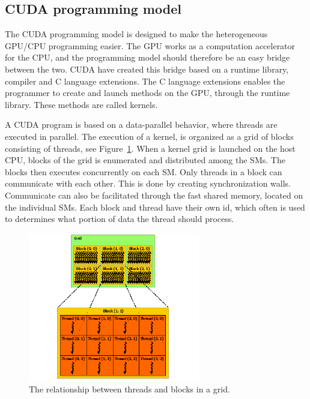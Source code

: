 \subsection{CUDA programming model} %
\label{ssub:cuda_programming_model}

The CUDA programming model is designed to make the heterogeneous GPU/CPU programming easier. The GPU works as a computation accelerator for the CPU, and the programming model should therefore be an easy bridge between the two. CUDA have created this bridge based on a runtime library, compiler and C language extensions. The C language extensions enables the programmer to create and launch methods on the GPU, through the runtime library. These methods are called kernels.

A CUDA program is based on a data-parallel behavior, where threads are executed in parallel. The execution of a kernel, is organized as a grid of blocks consisting of threads, see Figure~\ref{fig:thread_block}. When a kernel grid is launched on the host CPU, blocks of the grid is enumerated and distributed among the SMs. The blocks then executes concurrently on each SM\@. Only threads in a block can communicate with each other. This is done by creating synchronization walls. Communicate can also be facilitated through the fast shared memory, located on the individual SMs\@. Each block and thread have their own id, which often is used to determines what portion of data the thread should process.

\begin{figure}[ht!]
\centering
\includegraphics[width=75mm]{../gfx/blocks_and_threads.png}
\caption{The relationship between threads and blocks in a grid.}
\label{fig:thread_block}
\end{figure}

\cleardoublepage
